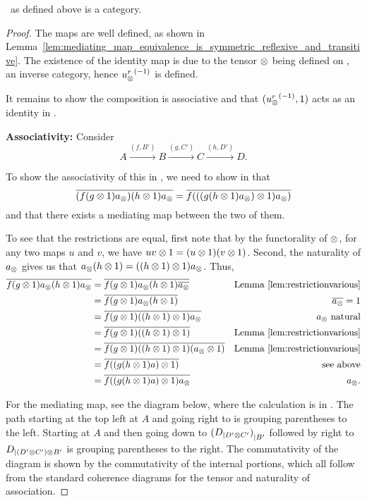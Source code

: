 \begin{lemma}\label{lem:xt_is_a_category}
  \Xt\ as defined above is a category.
\end{lemma}
\begin{proof}
  The maps are well defined, as shown in
  Lemma~\ref{lem:mediating_map_equivalence_is_symmetric_reflexive_and_transitive}. The existence of
  the identity map is due to the tensor $\otimes$ being defined on \X, an inverse category, hence
  ${u_{\otimes}^r}^{(-1)}$ is defined.

  It remains to show the composition is associative and that $({u_{\otimes}^r}^{(-1)}, 1)$ acts as an identity
  in \Xt.

  \textbf{Associativity:}
  Consider
  \[
    A\xrightarrow{(f,B')}B\xrightarrow{(g,C')} C \xrightarrow{(h,D')}D.
  \]

  To show the associativity of this in \Xt, we need to show in \X that
  \[
    \overline{(f(g\otimes1)a_{\otimes}) (h\otimes1)a_{\otimes}} = \overline{f (((g(h\otimes1)a_{\otimes})\otimes1) a_{\otimes})}
  \]
  and that there exists a mediating map between the two of them.

  To see that the restrictions are equal, first note that by the functorality of $\otimes$, for any two
  maps $u$ and $v$, we have $u v \otimes 1 = (u\otimes1) (v\otimes1)$. Second, the naturality of $a_{\otimes}$ gives us
  that $a_{\otimes} (h \otimes 1) = ((h\otimes1)\otimes1) a_{\otimes}$. Thus,
  \begin{align*}
    \overline{f(g\otimes1)a_{\otimes} (h\otimes1)a_{\otimes}}
      & = \overline{f(g\otimes1)a_{\otimes} (h\otimes1)\overline{a_{\otimes}}}
    & \text{Lemma \ref{lem:restrictionvarious}} \\
    & = \overline{f(g\otimes1)a_{\otimes} (h\otimes1)} & \overline{a_{\otimes}}=1 \\
    & = \overline{f(g\otimes1) ((h\otimes1)\otimes1) a_{\otimes} } & a_{\otimes}\text{ natural} \\
    & = \overline{f(g\otimes1) ((h\otimes1)\otimes1) }
      &  \text{Lemma \ref{lem:restrictionvarious}}\\
    & = \overline{f(g\otimes1) ((h\otimes1)\otimes1) (a_{\otimes}\otimes1)}
      & \text{Lemma \ref{lem:restrictionvarious}}\\
    & = \overline{f((g (h\otimes1)a )\otimes1)} & \text{ see above}\\
    & = \overline{f((g (h\otimes1)a )\otimes1)a_{\otimes}} & a_{\otimes}.
  \end{align*}

  For the mediating map, see the diagram below, where the calculation is in \X. The path starting at
  the top left at $A$ and going right to  is grouping parentheses to the
  left. Starting at $A$ and then going down to ${({D}_{|{D' \otimes C'}})}_{|{B'}}$ followed by
  right to $ {D}_{|{(D' \otimes C') \otimes B'}}$ is grouping parentheses to the right. The
  commutativity of the diagram is shown by the commutativity of the internal portions, which all
  follow from the standard coherence diagrams for the tensor and naturality of association.


\end{proof}
